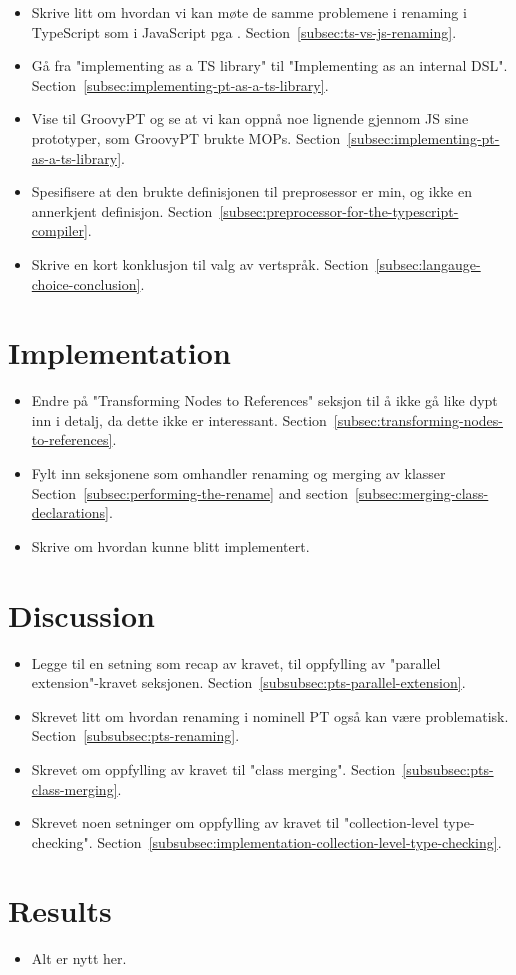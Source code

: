 \begin{itemize}
    \item Skrive litt om hvordan vi kan møte de samme problemene i renaming i TypeScript som i JavaScript pga .
    Section~\vref{subsec:ts-vs-js-renaming}.
    \item Gå fra "implementing as a TS library" til "Implementing as an internal DSL".
    Section~\vref{subsec:implementing-pt-as-a-ts-library}.
    \item Vise til GroovyPT og se at vi kan oppnå noe lignende gjennom JS sine prototyper, som GroovyPT brukte MOPs.
    Section~\vref{subsec:implementing-pt-as-a-ts-library}.
    \item Spesifisere at den brukte definisjonen til preprosessor er min, og ikke en annerkjent definisjon.
    Section~\vref{subsec:preprocessor-for-the-typescript-compiler}.
    \item Skrive en kort konklusjon til valg av vertspråk.
    Section~\vref{subsec:langauge-choice-conclusion}.
\end{itemize}

\section*{Implementation}

\begin{itemize}
    \item Endre på "Transforming Nodes to References" seksjon til å ikke gå like dypt inn i detalj, da dette ikke er interessant.
    Section~\vref{subsec:transforming-nodes-to-references}.
    \item Fylt inn seksjonene som omhandler renaming og merging av klasser
    Section~\vref{subsec:performing-the-rename} and section~\vref{subsec:merging-class-declarations}.
    \item Skrive om hvordan  kunne blitt implementert.
\end{itemize}

\section*{Discussion}

\begin{itemize}
    \item Legge til en setning som recap av kravet, til oppfylling av "parallel extension"-kravet seksjonen.
    Section~\vref{subsubsec:pts-parallel-extension}.
    \item Skrevet litt om hvordan renaming i nominell PT også kan være problematisk.
    Section~\vref{subsubsec:pts-renaming}.
    \item Skrevet om oppfylling av kravet til "class merging".
    Section~\vref{subsubsec:pts-class-merging}.
    \item Skrevet noen setninger om oppfylling av kravet til "collection-level type-checking".
    Section~\vref{subsubsec:implementation-collection-level-type-checking}.
\end{itemize}

\section*{Results}

\begin{itemize}
    \item Alt er nytt her.
\end{itemize}
